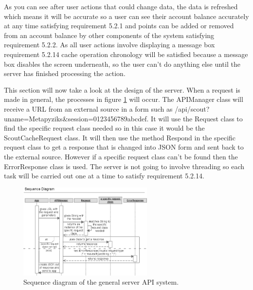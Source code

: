 As you can see after user actions that could change data, the data is refreshed which means it will be accurate so a user can see their account balance accurately at any time satisfying requirement 5.2.1 and points can be added or removed from an account balance by other components of the system satisfying requirement 5.2.2. As all user actions involve displaying a message box requirement 5.2.14 cache operation chronology will be satisfied because a message box disables the screen underneath, so the user can't do anything else until the server has finished processing the action.

This section will now take a look at the design of the server. When a request is made in general, the processes in figure \ref{fig:serverGeneral} will occur. The APIManager class will receive a URL from an external source in a form such as /api/scout?uname=Metapyziks\&session=0123456789abcdef. It will use the Request class to find the specific request class needed so in this case it would be the ScoutCacheRequest class. It will then use the method Respond in the specific request class to get a response that is changed into JSON form and sent back to the external source. However if a specific request class can't be found then the ErrorResponse class is used. The server is not going to involve threading so each task will be carried out one at a time to satisfy requirement 5.2.14.

\begin{figure}
    \includegraphics[width=0.6\textwidth]{images/sequence/Servergeneral}
    \caption{Sequence diagram of the general server API system.}
    \label{fig:serverGeneral}
\end{figure}

